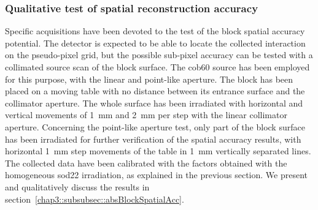 \subsubsection{Qualitative test of spatial reconstruction accuracy}\label{chap3::subsubsec::test_spatial_scan}
Specific acquisitions have been devoted to the test of the block spatial accuracy potential. The detector is expected to be able to locate the collected interaction on the pseudo-pixel grid, but the possible sub-pixel accuracy can be tested with a collimated source scan of the block surface. The \gls{cob60} source has been employed for this purpose, with the linear and point-like aperture. The block has been placed on a moving table with no distance between its entrance surface and the collimator aperture. The whole surface has been irradiated with horizontal and vertical movements of 1~mm and 2~mm per step with the linear collimator aperture. Concerning the point-like aperture test, only part of the block surface has been irradiated for further verification of the spatial accuracy results, with horizontal 1~mm step movements of the table in 1~mm vertically separated lines. The collected data have been calibrated with the factors obtained with the homogeneous \gls{sod22} irradiation, as explained in the previous section. We present and qualitatively discuss the results in section~\ref{chap3::subsubsec::absBlockSpatialAcc}. 

